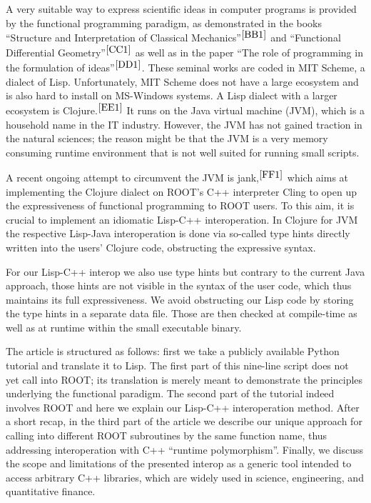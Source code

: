 \documentclass[twocolumn]{article}
\begin{document}
A very suitable way to express scientific ideas in computer programs is provided by the functional programming paradigm, as demonstrated in the books “Structure and Interpretation of Classical Mechanics”$^{\cite{BB1}}$ and “Functional Differential Geometry”$^{\cite{CC1}}$ as well as in the paper “The role of programming in the formulation of ideas”$^{\cite{DD1}}$. These seminal works are coded in MIT Scheme, a dialect of Lisp. Unfortunately, MIT Scheme does not have a large ecosystem and is also hard to install on MS-Windows systems. A Lisp dialect with a larger ecosystem is Clojure.$^{\cite{EE1}}$ It runs on the Java virtual machine (JVM), which is a household name in the IT industry. However, the JVM has not gained traction in the natural sciences; the reason might be that the JVM is a very memory consuming runtime environment that is not well suited for running small scripts.

A recent ongoing attempt to circumvent the JVM is jank,$^{\cite{FF1}}$ which aims at implementing the Clojure dialect on ROOT’s C++ interpreter Cling to open up the expressiveness of functional programming to ROOT users. To this aim, it is crucial to implement an idiomatic Lisp-C++ interoperation. In Clojure for JVM the respective Lisp-Java interoperation is done via so-called type hints directly written into the users’ Clojure code, obstructing the expressive syntax.

For our Lisp-C++ interop we also use type hints but contrary to the current Java approach, those hints are not visible in the syntax of the user code, which thus maintains its full expressiveness. We avoid obstructing our Lisp code by storing the type hints in a separate data file. Those are then checked at compile-time as well as at runtime within the small executable binary.

The article is structured as follows: first we take a publicly available Python tutorial and translate it to Lisp. The first part of this nine-line script does not yet call into ROOT; its translation is merely meant to demonstrate the principles underlying the functional paradigm. The second part of the tutorial indeed involves ROOT and here we explain our Lisp-C++ interoperation method. After a short recap, in the third part of the article we describe our unique approach for calling into different ROOT subroutines by the same function name, thus addressing interoperation with C++ “runtime polymorphism”. Finally, we discuss the scope and limitations of the presented interop as a generic tool intended to access arbitrary C++ libraries, which are widely used in science, engineering, and quantitative finance.
\end{document}
